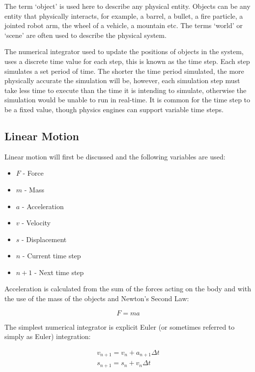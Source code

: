 The term `object' is used here to describe any physical entity. Objects can be any entity that physically interacts, for example, a barrel, a bullet, a fire particle, a jointed robot arm, the wheel of a vehicle, a mountain etc. The terms `world' or `scene' are often used to describe the physical system.

The numerical integrator used to update the positions of objects in the system, uses a discrete time value for each step, this is known as the time step. Each step simulates a set period of time. The shorter the time period simulated, the more physically accurate the simulation will be, however, each simulation step must take less time to execute than the time it is intending to simulate, otherwise the simulation would be unable to run in real-time. It is common for the time step to be a fixed value, though physics engines can support variable time steps.

\subsection{Linear Motion}
Linear motion will first be discussed and the following variables are used:
\begin{itemize}
	\item $F$ - Force
	\item $m$ - Mass
	\item $a$ - Acceleration
	\item $v$ - Velocity
	\item $s$ - Displacement
	\item $n$ - Current time step
	\item $n+1$ - Next time step
\end{itemize}

Acceleration is calculated from the sum of the forces acting on the body and with the use of the mass of the objects and Newton's Second Law:

\begin{equation}
F=ma
\end{equation}

The simplest numerical integrator is explicit Euler (or sometimes referred to simply as Euler) integration:

\begin{equation}
\begin{split}
	v_{n+1}=v_n+a_{n+1}{\Delta}t\\
	s_{n+1}=s_n+v_{n}{\Delta}t
\end{split}
\end{equation}

